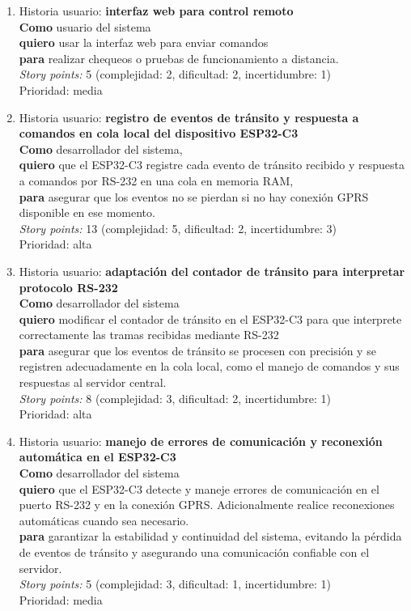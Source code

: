 \documentclass[
11pt, %
]{charter}
\begin{document}
\begin{enumerate}
\item  Historia usuario: \textbf{interfaz web para control remoto}\\
\textbf{Como} usuario del sistema\\
\textbf{quiero} usar la interfaz web para enviar comandos\\
\textbf{para} realizar chequeos o pruebas de funcionamiento a distancia.\\
\textit{Story points:} 5 (complejidad: 2, dificultad: 2, incertidumbre: 1)\\
Prioridad: media

\item  Historia usuario: \textbf{registro de eventos de tránsito y respuesta a comandos en cola local del dispositivo ESP32-C3}\\
\textbf{Como} desarrollador del sistema,\\
\textbf{quiero} que el ESP32-C3 registre cada evento de tránsito recibido y respuesta a comandos por RS-232 en una cola en memoria RAM,\\
\textbf{para} asegurar que los eventos no se pierdan si no hay conexión GPRS disponible en ese momento.\\
\textit{Story points:} 13 (complejidad: 5, dificultad: 2, incertidumbre: 3)\\
Prioridad: alta

\item  Historia usuario: \textbf{adaptación del contador de tránsito para interpretar protocolo RS-232}\\
\textbf{Como} desarrollador del sistema\\
\textbf{quiero} modificar el contador de tránsito en el ESP32-C3 para que interprete correctamente las tramas recibidas mediante RS-232\\
\textbf{para} asegurar que los eventos de tránsito se procesen con precisión y se registren adecuadamente en la cola local, como el manejo de comandos y sus respuestas al servidor central.\\
\textit{Story points:} 8 (complejidad: 3, dificultad: 2, incertidumbre: 1)\\
Prioridad: alta

\item  Historia usuario: \textbf{manejo de errores de comunicación y reconexión automática en el ESP32-C3}\\
\textbf{Como} desarrollador del sistema\\
\textbf{quiero} que el ESP32-C3 detecte y maneje errores de comunicación en el puerto RS-232 y en la conexión GPRS. Adicionalmente realice reconexiones automáticas cuando sea necesario.\\
\textbf{para} garantizar la estabilidad y continuidad del sistema, evitando la pérdida de eventos de tránsito y asegurando una comunicación confiable con el servidor.\\
\textit{Story points:} 5 (complejidad: 3, dificultad: 1, incertidumbre: 1)\\
Prioridad: media

\end{enumerate}
\end{document}
